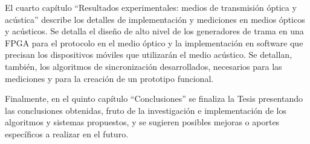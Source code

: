 El cuarto capítulo ``Resultados experimentales: medios de transmisión óptica y acústica'' describe los detalles de implementación y mediciones en medios ópticos y acústicos. Se detalla el diseño de alto nivel de los generadores de trama en una FPGA para el protocolo en el medio óptico y la implementación en software que precisan los dispositivos móviles que utilizarán el medio acústico. Se detallan, también, los algoritmos de sincronización desarrollados, necesarios para las mediciones y para la creación de un prototipo funcional.

Finalmente, en el quinto capítulo ``Conclusiones'' se finaliza la Tesis presentando las conclusiones obtenidas, fruto de la investigación e implementación de los algoritmos y sistemas propuestos, y se sugieren posibles mejoras o aportes específicos a realizar en el futuro.
